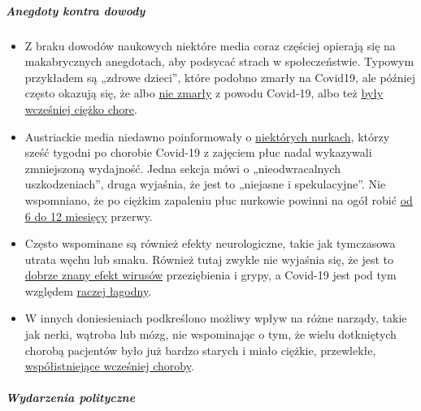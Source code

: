 \hypertarget{anegdoty-kontra-dowody}{%
\subparagraph{\texorpdfstring{\textbf{Anegdoty kontra
dowody}}{Anegdoty kontra dowody}}\label{anegdoty-kontra-dowody}}

\begin{itemize}
\tightlist
\item
  Z braku dowodów naukowych niektóre media coraz częściej opierają się
  na makabrycznych anegdotach, aby podsycać strach w społeczeństwie.
  Typowym przykładem są „zdrowe dzieci'', które podobno zmarły na
  Covid19, ale później często okazują się, że albo
  \href{https://www.dailymail.co.uk/news/article-8193487/Coroner-refuses-rule-COVID-19-cause-death-six-week-old-Connecticut-baby.html}{nie
  zmarły} z powodu Covid-19, albo też
  \href{https://sports.yahoo.com/spanish-football-coach-francisco-garcia-163153573.html}{były
  wcześniej ciężko chore}.
\item
  Austriackie media niedawno poinformowały o
  \href{https://www.rainews.it/tgr/tagesschau/articoli/2020/04/tag-Coronavirus-Lungeschaden-Forschung-Uniklinik-Innsbruck-6708e11e-28dc-4843-a760-e7f926ace61c.html}{niektórych
  nurkach}, którzy sześć tygodni po chorobie Covid-19 z zajęciem płuc
  nadal wykazywali zmniejszoną wydajność. Jedna sekcja mówi o
  „nieodwracalnych uszkodzeniach'', druga wyjaśnia, że jest to „niejasne
  i spekulacyjne''. Nie wspomniano, że po ciężkim zapaleniu płuc
  nurkowie powinni na ogół robić
  \href{https://www.deeperblue.com/pulmonary-considerations-in-diving/}{od
  6 do 12 miesięcy} przerwy.
\item
  Często wspominane są również efekty neurologiczne, takie jak
  tymczasowa utrata węchu lub smaku. Również tutaj zwykle nie wyjaśnia
  się, że jest to
  \href{https://www.ncbi.nlm.nih.gov/pubmed/25294743}{dobrze znany efekt
  wirusów} przeziębienia i grypy, a Covid-19 jest pod tym względem
  \href{https://www.ncbi.nlm.nih.gov/pubmed/23948436}{raczej łagodny}.
\item
  W innych doniesieniach podkreślono możliwy wpływ na różne narządy,
  takie jak nerki, wątroba lub mózg, nie wspominając o tym, że wielu
  dotkniętych chorobą pacjentów było już bardzo starych i miało ciężkie,
  przewlekłe,
  \href{https://www.epicentro.iss.it/coronavirus/sars-cov-2-decessi-italia}{współistniejące
  wcześniej choroby}.
\end{itemize}

\hypertarget{wydarzenia-polityczne-1}{%
\subparagraph{\texorpdfstring{\textbf{Wydarzenia
polityczne}}{Wydarzenia polityczne}}\label{wydarzenia-polityczne-1}}

